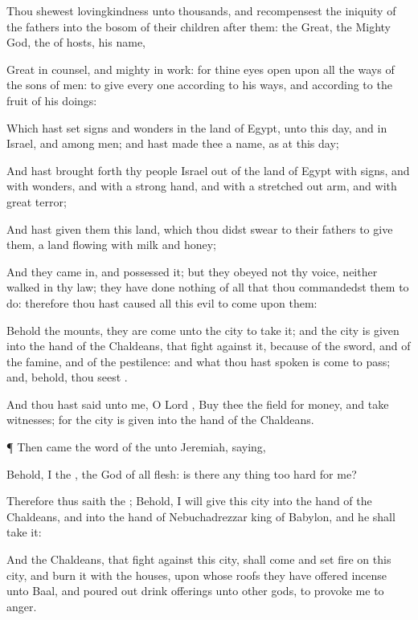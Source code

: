 {Thou
shewest
lovingkindness unto
thousands, and
recompensest the
iniquity of the
fathers into the
bosom of their
children
after them: the
Great, the
Mighty
God, the
{} of
hosts,
{} his
name,

Great in
counsel, and
mighty in
work: for thine
eyes
{}
open upon all the
ways of the
sons of
men: to
give every
one according to his
ways, and according to the
fruit of his
doings:

Which hast
set
signs and
wonders in the
land of
Egypt,
{} unto this
day, and in
Israel, and among
{}
men; and hast
made thee a
name, as at this
day;

And hast brought
forth thy
people
Israel out of the
land of
Egypt with
signs, and with
wonders, and with a
strong
hand, and with a stretched
out
arm, and with
great
terror;

And hast
given them this
land, which thou didst
swear to their
fathers to
give them, a
land
flowing with
milk and
honey;

And they came
in, and
possessed it; but they
obeyed not thy
voice, neither
walked in thy
law; they have
done nothing of all that thou
commandedst them to
do: therefore thou hast caused all this
evil to
come upon them:

Behold the
mounts, they are
come unto the
city to
take it; and the
city is
given into the
hand of the
Chaldeans, that
fight against it,
because of the
sword, and of the
famine, and of the
pestilence: and what thou hast
spoken is come to pass; and, behold, thou
seest
{}.

And thou hast
said unto me, O
Lord
{},
Buy thee the
field for
money, and
take
witnesses; for the
city is
given into the
hand of the
Chaldeans.


\par }{\PP {}¶ Then came the
word of the
{} unto
Jeremiah,
saying,

Behold, I
{} the
{}, the
God of all
flesh: is there any
thing too
hard for me?

Therefore thus
saith the
{}; Behold, I will
give this
city into the
hand of the
Chaldeans, and into the
hand of
Nebuchadrezzar
king of
Babylon, and he shall
take it:

And the
Chaldeans, that
fight against this
city, shall
come and
set
fire on this
city, and
burn it with the
houses, upon whose
roofs they have offered
incense unto
Baal, and poured
out drink
offerings unto
other
gods, to provoke me to
anger.

}
